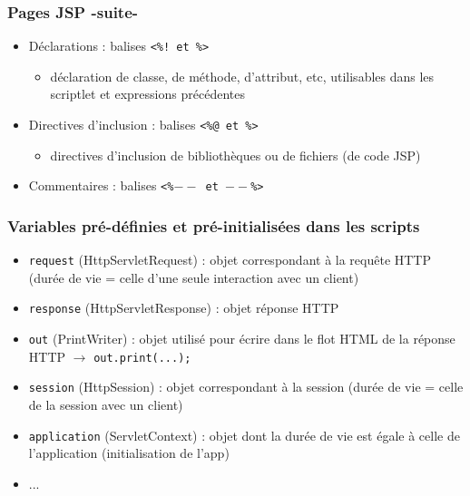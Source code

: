 \documentclass{beamer}
\begin{document}
\begin{frame}
	\frametitle{Pages JSP -suite-}
	\begin{itemize}  
		\item Déclarations : balises \texttt{<\%! et \%>}
		\begin{itemize}
			\item déclaration de classe, de méthode, d’attribut, etc,
			utilisables dans les scriptlet et expressions précédentes
		\end{itemize}
		\item Directives d'inclusion : balises \texttt{<\%@ et \%>}
		\begin{itemize}
			\item directives d'inclusion de bibliothèques ou de fichiers (de code JSP)
		\end{itemize}
		\item Commentaires : balises \texttt{<\%$--$ et $--$\%>}
	\end{itemize}
\end{frame}

\begin{frame}
	\frametitle{Variables pré-définies et pré-initialisées dans les scripts}
	\begin{itemize}  
		\item \texttt{request} (HttpServletRequest) : objet correspondant
		à la requête HTTP (durée de vie = celle d’une seule interaction
		avec un client)
		\item \texttt{response} (HttpServletResponse) : objet réponse HTTP
		\item \texttt{out} (PrintWriter) : objet utilisé pour écrire dans
		le flot HTML de la réponse HTTP $\rightarrow$ \texttt{out.print(...);}
		\item \texttt{session} (HttpSession) : objet correspondant à la
		session (durée de vie = celle de la session avec un client)
		\item \texttt{application} (ServletContext) : objet 
		dont la durée de vie est égale à celle de l’application (initialisation de l'app)
		\item ...
	\end{itemize}
\end{frame}
\end{document}

